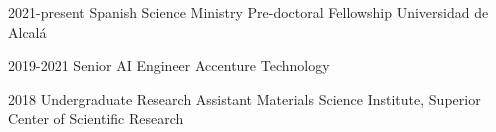 

\begin{cvskills}

  \cvskill
    {2021-present} %
    {Spanish Science Ministry Pre-doctoral Fellowship} %
    {Universidad de Alcalá} %

  \cvskill
    {2019-2021} %
    {Senior AI Engineer} %
    {Accenture Technology} %

  \cvskill
    {2018} %
    {Undergraduate Research Assistant} %
    {Materials Science Institute, Superior Center of Scientific Research} %

\end{cvskills}
